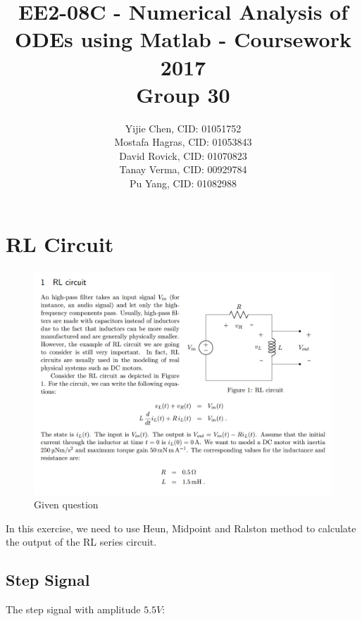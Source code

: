 \documentclass[a4paper, 12pt]{article}
\title{
	{EE2-08C - Numerical Analysis of ODEs using Matlab - Coursework 2017 \\ Group 30}
}
\author{Yijie Chen, CID: 01051752 \\ Mostafa Hagras, CID: 01053843\\ David Rovick, CID:  01070823\\ Tanay Verma, CID: 00929784 \\ Pu Yang, CID: 01082988}
\begin{document}
\maketitle
\tableofcontents

\newpage

\section{RL Circuit}

\begin{figure}[h]
\centering
\includegraphics[width=\textwidth]{ex1/q.PNG}
\caption{Given question}
\end{figure}

In this exercise, we need to use Heun, Midpoint and Ralston method to calculate the output of the RL series circuit.

\subsection{Step Signal}

The step signal with amplitude $5.5V$:\par
\end{document}

